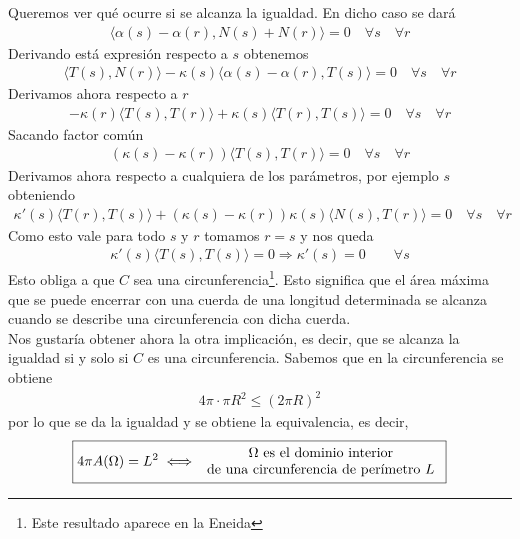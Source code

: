 \begin{observacion}
\begin{enumerate}[start=4]
        Queremos ver qué ocurre si se alcanza la igualdad. En dicho caso se dará
        \begin{gather*}
            \langle \alpha(s)-\alpha(r), N(s)+N(r)\rangle = 0 \quad \forall s \quad \forall r
        \end{gather*}
        Derivando está expresión respecto a $s$ obtenemos
        \begin{gather*}
            \langle T(s) , N(r) \rangle - \kappa(s)\langle \alpha(s)-\alpha(r), T(s) \rangle = 0 \quad \forall s \quad \forall r
        \end{gather*}
        Derivamos ahora respecto a $r$
        \begin{gather*}
            -\kappa(r)\langle T(s), T(r)\rangle + \kappa(s) \langle T(r), T(s) \rangle = 0 \quad \forall s \quad \forall r
        \end{gather*}
        Sacando factor común
        \begin{gather*}
            (\kappa(s) - \kappa(r))\langle T(s), T(r) \rangle = 0 \quad \forall s \quad \forall r
        \end{gather*}
        Derivamos ahora respecto a cualquiera de los parámetros, por ejemplo $s$ obteniendo
        \begin{gather*}
            \kappa'(s)\langle T(r), T(s) \rangle + (\kappa(s)- \kappa(r)) \kappa(s)\langle N(s), T(r) \rangle = 0 \quad \forall s \quad \forall r
        \end{gather*}
        Como esto vale para todo $s$ y $r$ tomamos $r=s$ y nos queda
        \begin{gather*}
            \kappa'(s) \langle T(s), T(s) \rangle = 0 \Rightarrow \kappa'(s)=0 \qquad \forall s
        \end{gather*}
        Esto obliga a que $C$ sea una circunferencia\footnote{Este resultado aparece en la Eneida}. Esto significa que el área máxima que se puede encerrar con una cuerda de una longitud determinada se alcanza cuando se describe una circunferencia con dicha cuerda.\\

        Nos gustaría obtener ahora la otra implicación, es decir, que se alcanza la igualdad si y solo si $C$ es una circunferencia. Sabemos que en la circunferencia se obtiene
        \begin{gather*}
            4\pi \cdot \pi R^2 \leq (2\pi R)^2
        \end{gather*}
        por lo que se da la igualdad y se obtiene la equivalencia, es decir,
        \begin{gather*}
            \boxed{4\pi A(\Omega) = L^2 \iff 
            \begin{array}{c}
                \Omega \text{ es el dominio interior}\\
                \text{de una circunferencia de perímetro $L$}
            \end{array}
            }
        \end{gather*}


\end{enumerate}
\end{observacion}
